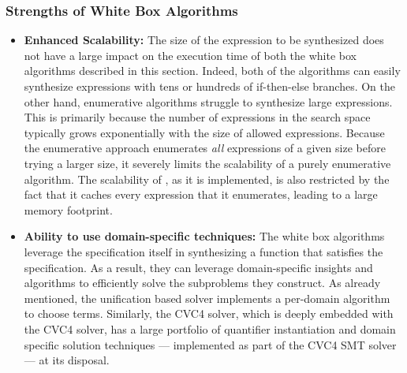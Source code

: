 \subsubsection{Strengths of White Box Algorithms}
\begin{itemize}
\item
\textbf{Enhanced Scalability:} The size of the expression to be
synthesized does not have a large impact on the execution time of both
the white box algorithms described in this section. Indeed, both of
the algorithms can easily synthesize expressions with tens or hundreds
of if-then-else branches. On the other hand, enumerative algorithms
struggle to synthesize large expressions. This is primarily because
the number of expressions in the search space typically grows
exponentially with the size of allowed expressions. Because the
enumerative approach enumerates \emph{all} expressions of a given size
before trying a larger size, it severely limits the scalability of a
purely enumerative algorithm. The scalability of \esolver, as it is
implemented, is also restricted by the fact that it caches every
expression that it enumerates, leading to a large memory footprint.
\item
\textbf{Ability to use domain-specific techniques:} The white
box algorithms leverage the specification itself in synthesizing a
function that satisfies the specification. As a result, they can
leverage domain-specific insights and algorithms to efficiently solve
the subproblems they construct. As already mentioned, the unification
based solver implements a per-domain algorithm to choose
terms. Similarly, the CVC4 solver, which is deeply embedded with the
CVC4 solver, has a large portfolio of quantifier instantiation and
domain specific solution techniques --- implemented as part of the
CVC4 SMT solver --- at its disposal.
\end{itemize}

